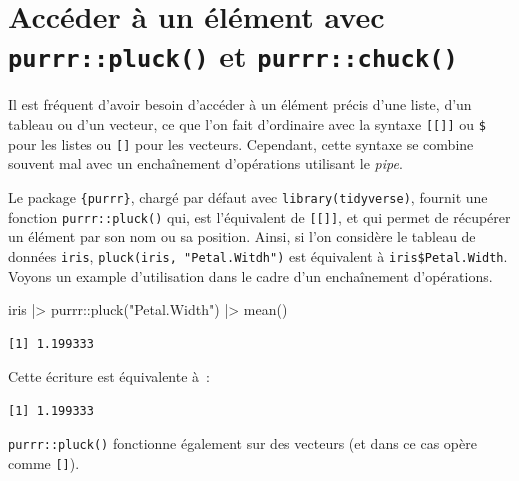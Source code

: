\documentclass[
  letterpaper,
  DIV=11,
  numbers=noendperiod,
  oneside]{scrreprt}
\newenvironment{Shaded}{\begin{snugshade}}{\end{snugshade}}
\newcommand{\FunctionTok}[1]{\textcolor[rgb]{0.28,0.35,0.67}{#1}}
\newcommand{\NormalTok}[1]{\textcolor[rgb]{0.00,0.23,0.31}{#1}}
\newcommand{\SpecialCharTok}[1]{\textcolor[rgb]{0.37,0.37,0.37}{#1}}
\newcommand{\StringTok}[1]{\textcolor[rgb]{0.13,0.47,0.30}{#1}}
\begin{document}
\hypertarget{sec-pluck-chuck}{%
\section{\texorpdfstring{Accéder à un élément avec
\texttt{purrr::pluck()} et
\texttt{purrr::chuck()}}{Accéder à un élément avec purrr::pluck() et purrr::chuck()}}\label{sec-pluck-chuck}}

Il est fréquent d'avoir besoin d'accéder à un élément précis d'une
liste, d'un tableau ou d'un vecteur, ce que l'on fait d'ordinaire avec
la syntaxe \texttt{{[}{[}{]}{]}} ou \texttt{\$} pour les listes ou
\texttt{{[}{]}} pour les vecteurs. Cependant, cette syntaxe se combine
souvent mal avec un enchaînement d'opérations utilisant le \emph{pipe}.

Le package \texttt{\{purrr\}}, chargé par défaut avec
\texttt{library(tidyverse)}, fournit une fonction
\texttt{purrr::pluck()} qui, est l'équivalent de \texttt{{[}{[}{]}{]}},
et qui permet de récupérer un élément par son nom ou sa position. Ainsi,
si l'on considère le tableau de données \texttt{iris},
\texttt{pluck(iris,\ "Petal.Witdh")} est équivalent à
\texttt{iris\$Petal.Width}. Voyons un example d'utilisation dans le
cadre d'un enchaînement d'opérations.

\begin{Shaded}
\begin{Highlighting}[]
\NormalTok{iris }\SpecialCharTok{|\textgreater{}} 
\NormalTok{  purrr}\SpecialCharTok{::}\FunctionTok{pluck}\NormalTok{(}\StringTok{"Petal.Width"}\NormalTok{) }\SpecialCharTok{|\textgreater{}} 
  \FunctionTok{mean}\NormalTok{()}
\end{Highlighting}
\end{Shaded}

\begin{verbatim}
[1] 1.199333
\end{verbatim}

Cette écriture est équivalente à~:

\begin{Shaded}
\end{Shaded}

\begin{verbatim}
[1] 1.199333
\end{verbatim}

\texttt{purrr::pluck()} fonctionne également sur des vecteurs (et dans
ce cas opère comme \texttt{{[}{]}}).
\end{document}
